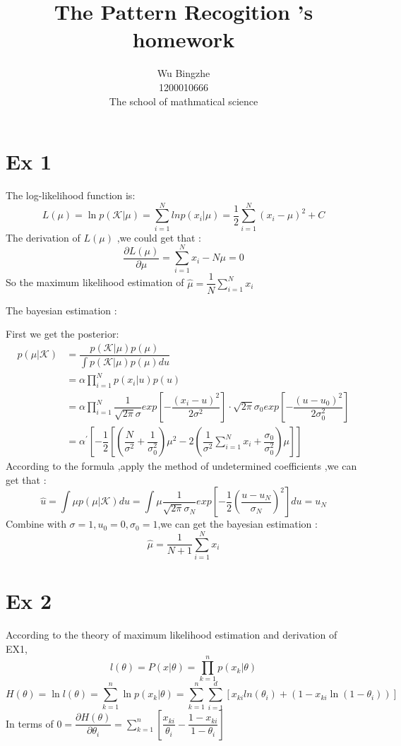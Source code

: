 \documentclass[10pt,a4paper]{article}
\author{Wu Bingzhe\\1200010666\\The school of mathmatical science}
\title{The Pattern Recogition 's homework}
\begin{document}
	\maketitle
	\section{Ex 1}
	
	The log-likelihood function is:
	\begin{equation}
	L(\mu)=\ln p(\mathscr{K}|\mu)=\sum_{i=1}^{N}lnp(x_i|\mu)=\dfrac{1}{2}\sum_{i=1}^{N}(x_i-\mu)^2+C
	\end{equation}
	The derivation of $L(\mu)$ ,we could get that :
	\begin{equation*}
	\dfrac{\partial L(\mu )}{\partial \mu}=\sum_{i=1}^{N}x_i-N\mu =0
	\end{equation*}
	So the maximum likelihood estimation of $\hat{\mu}=\dfrac{1}{N}\sum_{i=1}^{N}x_i$
	
	The bayesian estimation :
	
	First we get the posterior:
	\begin{equation*}
	\begin{split}
	p(\mu|\mathscr{K})&=\dfrac{p(\mathscr{K}|\mu )p(\mu)}{\int p(\mathscr{K}|\mu )p(\mu)du}\\
	&=\alpha \prod_{i=1}^{N}p(x_i|u)p(u)\\
	&=\alpha\prod_{i=1}^{N}\dfrac{1}{\sqrt{2\pi}\sigma}exp[-\dfrac{(x_i-u)^2}{2\sigma^2}]\cdot\sqrt{2\pi}\sigma_0 exp[-\dfrac{(u-u_0)^2}{2\sigma_0^2}] \\
	&=\alpha^{'}[-\dfrac{1}{2}[(\dfrac{N}{\sigma^2}+\dfrac{1}{\sigma_0^2})\mu^2-2(\dfrac{1}{\sigma^2}\sum_{i=1}^{N}x_i+\dfrac{\sigma_0}{\sigma_0^2})\mu ]]
	\end{split}
	\end{equation*}
	According to the formula ,apply the method of undetermined coefficients ,we can get that :
	\begin{equation*}
	\hat{u} =\int\mu p(\mu|\mathscr{K})du=\int\mu\dfrac{1}{\sqrt{2\pi}\sigma_N}exp[-\dfrac{1}{2}(\dfrac{u-u_N}{\sigma_N})^2]du=u_N
	\end{equation*}
	Combine with $\sigma=1,u_0=0,\sigma_0=1$,we can get the bayesian estimation :
	\begin{equation*}
	\hat{\mu}=\dfrac{1}{N+1}\sum_{i=1}^{N}x_i
	\end{equation*}
	\section{Ex 2}
	According to the theory of maximum likelihood estimation and derivation of EX1,
	\begin{equation*}
	l(\theta)=P(x|\theta)=\prod_{k=1}^{n}p(x_k|\theta)
	\end{equation*}
	\begin{equation*}
	H(\theta)=\ln l(\theta)=\sum_{k=1}^{n}\ln p(x_k|\theta)=\sum_{k=1}^{n}\sum_{i=1}^{d}[x_{ki}ln(\theta_i)+(1-x_{ki}\ln(1-\theta_i))]
	\end{equation*}
	In terms of $0=\dfrac{\partial H(\theta)}{\partial \theta_i}=\sum_{k=1}^{n}[\dfrac{x_{ki}}{\theta_i}-\dfrac{1-x_{ki}}{1-\theta_i}]$
	
\end{document}
